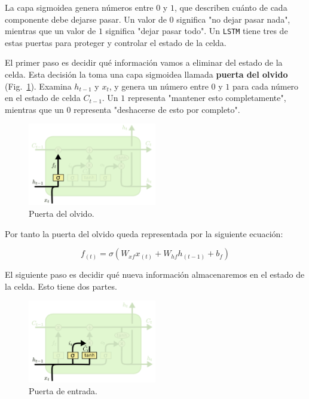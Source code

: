\documentclass[a4paper,12pt]{article}
\begin{document}
La capa sigmoidea genera números entre $0$ y $1$, que describen cuánto de cada componente debe dejarse pasar. Un valor de $0$ significa "no dejar pasar nada", mientras que un valor de $1$ significa "dejar pasar todo". Un \texttt{LSTM} tiene tres de estas puertas para proteger y controlar el estado de la celda.

El primer paso es decidir qué información vamos a eliminar del estado de la celda. Esta decisión la toma una capa sigmoidea llamada \textbf{puerta del olvido} (Fig.~\ref{fig:lstm2}). Examina $h_{t-1}$ y $x_t$, y genera un número entre $0$ y $1$ para cada número en el estado de celda $C_{t-1}$. Un $1$ representa "mantener esto completamente", mientras que un $0$ representa "deshacerse de esto por completo".

\begin{figure}[H]
	\begin{center}				
		\includegraphics[width=0.5\textwidth]{lstm2.png}
		\caption{Puerta del olvido. \citep{olahlstm}}
		\label{fig:lstm2}
	\end{center}
\end{figure}

Por tanto la puerta del olvido queda representada por la siguiente ecuación:

$$f_{(t)} = \sigma (W_{xf}x_{(t)} + W_{hf}h_{(t-1)} + b_f)$$

El siguiente paso es decidir qué nueva información almacenaremos en el estado de la celda. Esto tiene dos partes. 

\begin{figure}[H]
	\begin{center}				
		\includegraphics[width=0.5\textwidth]{lstm3.png}
		\caption{Puerta de entrada. \citep{olahlstm}}
		\label{fig:lstm3}
	\end{center}
\end{figure}
\end{document}
